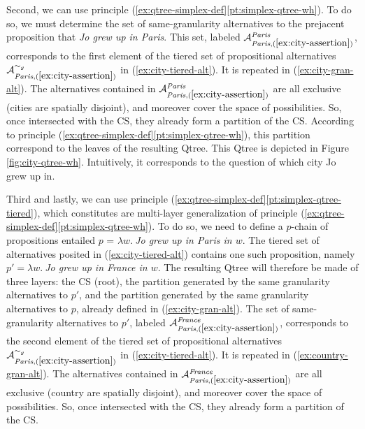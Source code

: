 Second, we can use principle (\ref{ex:qtree-simplex-def}\ref{pt:simplex-qtree-wh}). To do so, we must determine the set of same-granularity alternatives to the prejacent proposition that \textit{Jo grew up in Paris}. This set, labeled $\mathcal{A}_{\textit{Paris}, (\ref{ex:city-assertion})}^{\textit{Paris}}$, corresponds to the first element of the tiered set of propositional alternatives $\mathcal{A}_{\textit{Paris}, (\ref{ex:city-assertion})}^{\sim_g}$ in  (\ref{ex:city-tiered-alt}). It is repeated in (\ref{ex:city-gran-alt}). The alternatives contained in $\mathcal{A}_{\textit{Paris}, (\ref{ex:city-assertion})}^{\textit{Paris}}$ are all exclusive (cities are spatially disjoint), and moreover cover the space of possibilities. So, once intersected with the CS, they already form a partition of the CS. According to principle (\ref{ex:qtree-simplex-def}\ref{pt:simplex-qtree-wh}), this partition correspond to the leaves of the resulting Qtree. This Qtree is depicted in Figure \ref{fig:city-qtree-wh}. Intuitively, it corresponds to the question of which city Jo grew up in.


\begin{exe}
	\label{ex:city-gran-alt}
\end{exe} 

Third and lastly, we can use principle (\ref{ex:qtree-simplex-def}\ref{pt:simplex-qtree-tiered}), which constitutes are multi-layer generalization of principle (\ref{ex:qtree-simplex-def}\ref{pt:simplex-qtree-wh}). To do so, we need to define a $p$-chain of propositions entailed $p$ = $\lambda w. \ $\textit{Jo grew up in Paris in $w$}. The tiered set of alternatives posited in (\ref{ex:city-tiered-alt}) contains one such proposition, namely $p' = \lambda w. \ $\textit{Jo grew up in France in $w$}. The resulting Qtree will therefore be made of three layers: the CS (root), the partition generated by the same granularity alternatives to $p'$, and the partition generated by the same granularity alternatives to $p$, already defined in (\ref{ex:city-gran-alt}). The set of same-granularity alternatives to $p'$, labeled $\mathcal{A}_{\textit{Paris}, (\ref{ex:city-assertion})}^{\textit{France}}$, corresponds to the second element of the tiered set of propositional alternatives $\mathcal{A}_{\textit{Paris}, (\ref{ex:city-assertion})}^{\sim_g}$ in  (\ref{ex:city-tiered-alt}). It is repeated in (\ref{ex:country-gran-alt}). The alternatives contained in $\mathcal{A}_{\textit{Paris}, (\ref{ex:city-assertion})}^{\textit{France}}$ are all exclusive (country are spatially disjoint), and moreover cover the space of possibilities. So, once intersected with the CS, they already form a partition of the CS. 

